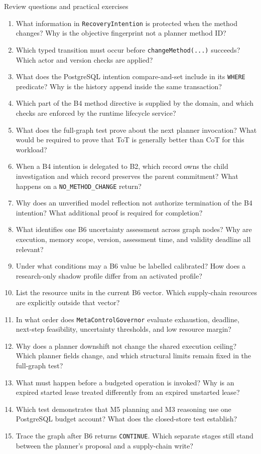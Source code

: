 \begin{reviewquestions}{Review questions and practical exercises}
\begin{enumerate}
  \item What information in \texttt{RecoveryIntention} is protected when the method changes? Why is the objective fingerprint not a planner method ID?
  \item Which typed transition must occur before \texttt{changeMethod(...)} succeeds? Which actor and version checks are applied?
  \item What does the PostgreSQL intention compare-and-set include in its \texttt{WHERE} predicate? Why is the history append inside the same transaction?
  \item Which part of the B4 method directive is supplied by the domain, and which checks are enforced by the runtime lifecycle service?
  \item What does the full-graph test prove about the next planner invocation? What would be required to prove that ToT is generally better than CoT for this workload?
  \item When a B4 intention is delegated to B2, which record owns the child investigation and which record preserves the parent commitment? What happens on a \texttt{NO\_METHOD\_CHANGE} return?
  \item Why does an unverified model reflection not authorize termination of the B4 intention? What additional proof is required for completion?
  \item What identifies one B6 uncertainty assessment across graph nodes? Why are execution, memory scope, version, assessment time, and validity deadline all relevant?
  \item Under what conditions may a B6 value be labelled calibrated? How does a research-only shadow profile differ from an activated profile?
  \item List the resource units in the current B6 vector. Which supply-chain resources are explicitly outside that vector?
  \item In what order does \texttt{MetaControlGovernor} evaluate exhaustion, deadline, next-step feasibility, uncertainty thresholds, and low resource margin?
  \item Why does a planner downshift not change the shared execution ceiling? Which planner fields change, and which structural limits remain fixed in the full-graph test?
  \item What must happen before a budgeted operation is invoked? Why is an expired started lease treated differently from an expired unstarted lease?
  \item Which test demonstrates that M5 planning and M3 reasoning use one PostgreSQL budget account? What does the closed-store test establish?
  \item Trace the graph after B6 returns \texttt{CONTINUE}. Which separate stages still stand between the planner's proposal and a supply-chain write?
\end{enumerate}


\end{reviewquestions}
